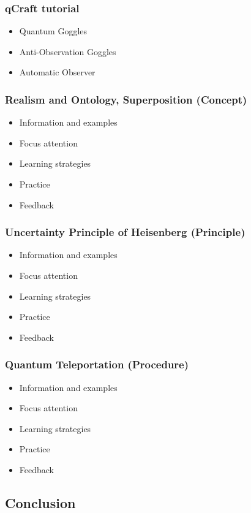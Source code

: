 \documentclass[11pt,twoside]{report} %
\begin{document}
\subsubsection{qCraft tutorial}
	\begin{itemize}
		\item Quantum Goggles
		\item Anti-Observation Goggles
		\item Automatic Observer
	\end{itemize}
\subsubsection{Realism and Ontology, Superposition (Concept)}
	\begin{itemize}
		\item Information and examples
		\item Focus attention
		\item Learning strategies
		\item Practice
		\item Feedback
	\end{itemize}
\subsubsection{Uncertainty Principle of Heisenberg (Principle)}
	\begin{itemize}
		\item Information and examples
		\item Focus attention
		\item Learning strategies
		\item Practice
		\item Feedback
	\end{itemize}
\subsubsection{Quantum Teleportation (Procedure)}
	\begin{itemize}
		\item Information and examples
		\item Focus attention
		\item Learning strategies
		\item Practice
		\item Feedback
	\end{itemize}

\subsection{Conclusion}
\end{document}
